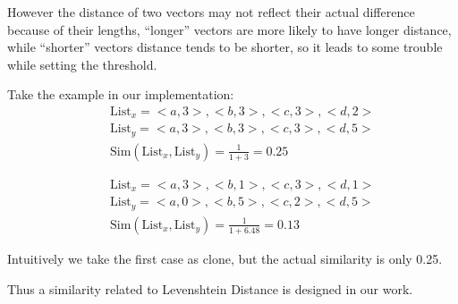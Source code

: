 \documentclass[../main.tex]{subfiles}
\begin{document}
However the distance of two vectors may not reflect their actual difference because of their lengths, ``longer'' vectors are more likely to have longer distance, while ``shorter'' vectors distance tends to be shorter, so it leads to some trouble while setting the threshold. 

Take the example in our implementation:
\begin{eqnarray}\nonumber
&&\text{List}_x = {<a, 3>, <b, 3>, <c, 3>, <d, 2>}\\ \nonumber
&&\text{List}_y = {<a, 3>, <b, 3>, <c, 3>, <d, 5>} \\ 
&&\text{Sim}(\text{List}_x, \text{List}_y) = \frac{1}{1 + 3} = 0.25
\end{eqnarray}

\begin{eqnarray}\nonumber
&&\text{List}_x = {<a, 3>, <b, 1>, <c, 3>, <d, 1>}\\ \nonumber
&&\text{List}_y = {<a, 0>, <b, 5>, <c, 2>, <d, 5>} \\ 
&&\text{Sim}(\text{List}_x, \text{List}_y) = \frac{1}{1 + 6.48} = 0.13
\end{eqnarray}

Intuitively we take the first case as clone, but the actual similarity is only 0.25.

Thus a similarity related to Levenshtein Distance is designed in our work.



\end{document}
